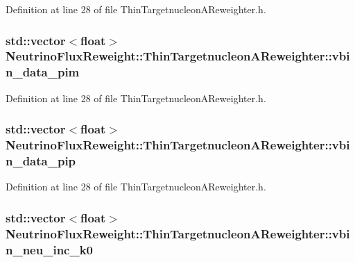 Definition at line 28 of file Thin\-Targetnucleon\-A\-Reweighter.\-h.

\hypertarget{class_neutrino_flux_reweight_1_1_thin_targetnucleon_a_reweighter_ae0b6c63ce05db44c64d8b272ce3cbaed}{
\subsubsection[{vbin\-\_\-data\-\_\-pim}]{\setlength{\rightskip}{0pt plus 5cm}std\-::vector$<$float$>$ Neutrino\-Flux\-Reweight\-::\-Thin\-Targetnucleon\-A\-Reweighter\-::vbin\-\_\-data\-\_\-pim}}\label{class_neutrino_flux_reweight_1_1_thin_targetnucleon_a_reweighter_ae0b6c63ce05db44c64d8b272ce3cbaed}


Definition at line 28 of file Thin\-Targetnucleon\-A\-Reweighter.\-h.

\hypertarget{class_neutrino_flux_reweight_1_1_thin_targetnucleon_a_reweighter_ae7012b962ce5fc1297fe56722661532a}{
\subsubsection[{vbin\-\_\-data\-\_\-pip}]{\setlength{\rightskip}{0pt plus 5cm}std\-::vector$<$float$>$ Neutrino\-Flux\-Reweight\-::\-Thin\-Targetnucleon\-A\-Reweighter\-::vbin\-\_\-data\-\_\-pip}}\label{class_neutrino_flux_reweight_1_1_thin_targetnucleon_a_reweighter_ae7012b962ce5fc1297fe56722661532a}


Definition at line 28 of file Thin\-Targetnucleon\-A\-Reweighter.\-h.

\hypertarget{class_neutrino_flux_reweight_1_1_thin_targetnucleon_a_reweighter_adaee6b1fb0e48aa2e40806ac78937b94}{
\subsubsection[{vbin\-\_\-neu\-\_\-inc\-\_\-k0}]{\setlength{\rightskip}{0pt plus 5cm}std\-::vector$<$float$>$ Neutrino\-Flux\-Reweight\-::\-Thin\-Targetnucleon\-A\-Reweighter\-::vbin\-\_\-neu\-\_\-inc\-\_\-k0}}\label{class_neutrino_flux_reweight_1_1_thin_targetnucleon_a_reweighter_adaee6b1fb0e48aa2e40806ac78937b94}


